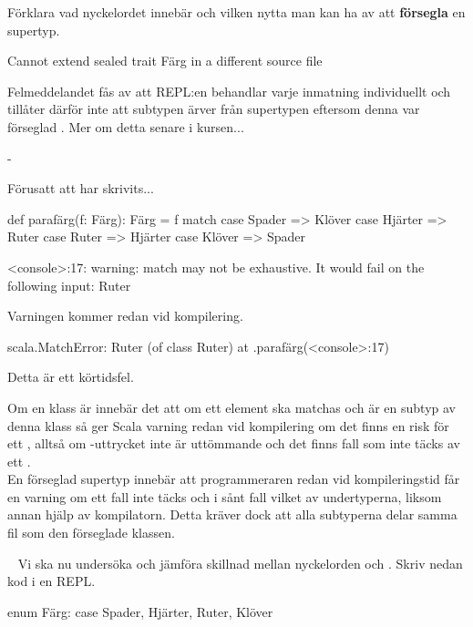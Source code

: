 \Subtask Förklara vad nyckelordet  innebär och vilken nytta man kan ha av att \textbf{försegla} en supertyp.


\SOLUTION


\TaskSolved \what

\SubtaskSolved
\begin{REPL}
Cannot extend sealed trait Färg in a different source file
\end{REPL}
Felmeddelandet fås av att REPL:en behandlar varje inmatning individuellt och tillåter därför inte att subtypen  ärver från  supertypen  eftersom denna var förseglad . Mer om detta senare i kursen...

\SubtaskSolved
-

\SubtaskSolved
Förusatt att  har skrivits...
\begin{Code}
def parafärg(f: Färg): Färg = f match
  case Spader  => Klöver
  case Hjärter => Ruter
  case Ruter   => Hjärter
  case Klöver  => Spader
\end{Code}

\SubtaskSolved
\begin{REPL}
<console>:17: warning: match may not be exhaustive.
It would fail on the following input: Ruter
\end{REPL}
Varningen kommer redan vid kompilering.

\SubtaskSolved
\begin{REPL}
scala.MatchError: Ruter (of class Ruter)
  at .parafärg(<console>:17)
\end{REPL}
Detta är ett körtidsfel.

\SubtaskSolved  Om en klass är  innebär det att om ett element ska matchas och är en subtyp av denna klass så ger Scala varning redan vid kompilering om det finns en risk för ett , alltså om -uttrycket inte är uttömmande och det finns fall som inte täcks av ett .\\
En förseglad supertyp innebär att programmeraren redan vid kompileringstid får en varning om ett fall inte täcks och i sånt fall vilket av undertyperna, liksom annan hjälp av kompilatorn. Detta kräver dock att alla subtyperna delar samma fil som den förseglade klassen.



\QUESTEND



\QUESTBEGIN
\Task	\what~ Vi ska nu undersöka och jämföra skillnad mellan nyckelorden  och . Skriv nedan kod i en REPL.
\begin{Code}
enum Färg:
  case Spader, Hjärter, Ruter, Klöver
\end{Code}

